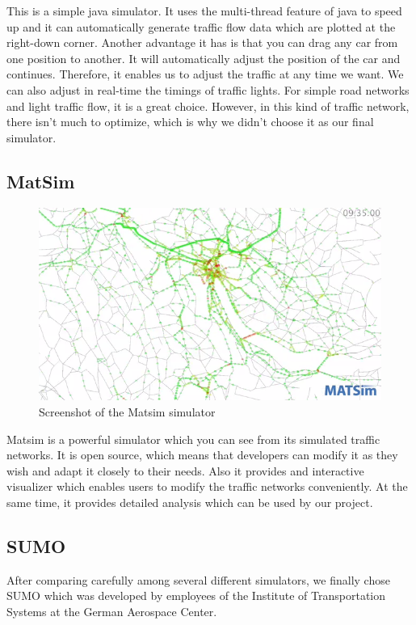 \documentclass{article} %
\begin{document}
This is a simple java simulator. It uses the multi-thread feature of java to speed up and it can automatically generate traffic flow data which are plotted at the right-down corner. Another advantage it has is that you can drag any car from one position to another. It will automatically adjust the position of the car and continues. Therefore, it enables us to adjust the traffic at any time we want. We can also adjust in real-time the timings of traffic lights. For simple road networks and light traffic flow, it is a great choice. However, in this kind of traffic network, there isn't much to optimize, which is why we didn't choose it as our final simulator. 

\subsection{MatSim}
\begin{figure}[]
\caption{Screenshot of the Matsim simulator}
 \includegraphics[width=\textwidth]{images/simulator/matsim_zurich.png}
\end{figure}

Matsim is a powerful simulator which you can see from its simulated traffic networks. 
It is open source, which means that developers can modify it as they wish and adapt it closely to their needs. Also it provides and interactive visualizer which enables users to modify the traffic networks conveniently. At the same time, it provides detailed analysis which can be used by our project.

\subsection{SUMO}
After comparing carefully among several different simulators, we finally chose SUMO which was developed by employees of the Institute of Transportation Systems at the German Aerospace Center.
\end{document}
